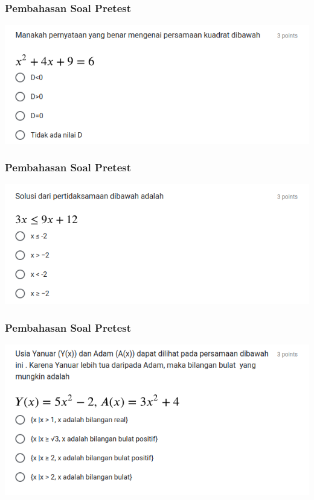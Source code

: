 \documentclass[pdflatex,compress,mathserif]{beamer}
\begin{document}
	\begin{frame}
		\frametitle{Pembahasan Soal Pretest}
		\begin{center}
			\includegraphics[width=\linewidth]{img/img07}
		\end{center}
	\end{frame}
	
	\begin{frame}
		\frametitle{Pembahasan Soal Pretest}
		\begin{center}
			\includegraphics[width=\linewidth]{img/img08}
		\end{center}
	\end{frame}
	
	\begin{frame}
		\frametitle{Pembahasan Soal Pretest}
		\begin{center}
			\includegraphics[width=\linewidth]{img/img09}
		\end{center}
	\end{frame}
	
\end{document}
